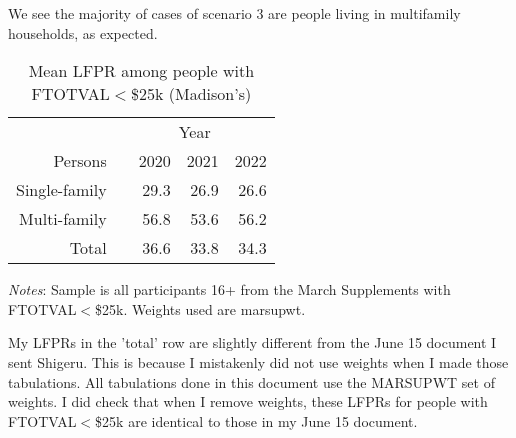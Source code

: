 \documentclass{article}
\newcommand{\mct}[1]{\multicolumn{1}{c}{#1}}
\newcommand{\mc}[3]{\multicolumn{#1}{#2}{#3}}
\begin{document}
We see the majority of cases of scenario 3 are people living in multifamily households, as expected.

\begin{table}[H]	
	\centering
	\caption{Mean LFPR among people with FTOTVAL$<$\$25k (Madison's)}
	\begin{tabularx}{0.8\textwidth}{@{\extracolsep{\fill}}r r r r r }
		\toprule 
		& \mc{4}{c}{Year}  \\ \cmidrule(lr){2-5}
		Persons	& 		&	\mct{2020}	&	\mct{2021}	&	\mct{2022}	\\ \midrule
		Single-family \hspace{0.1cm} 		&	&	29.3	&	26.9 &	26.6	\\	
		Multi-family \hspace{0.1cm}  	&	&	56.8	&	53.6	&	56.2	\\
		\midrule
		Total \hspace{0.1cm}  	&	&	36.6	&	33.8	&	34.3	\\
		\bottomrule
	\end{tabularx}
	\vspace{1mm}
	\vspace{1mm}
	\begin{minipage}[t]{\textwidth}
		\footnotesize{\emph{Notes}: Sample is all participants 16+ from the March Supplements with FTOTVAL$<$\$25k. Weights used are marsupwt.}
	\end{minipage}
\end{table}

My LFPRs in the 'total' row are slightly different from the June 15 document I sent Shigeru. This is because I mistakenly did not use weights when I made those tabulations. All tabulations done in this document use the MARSUPWT set of weights. I did check that when I remove weights, these LFPRs for people with FTOTVAL$<$\$25k are identical to those in my June 15 document.
\end{document}
